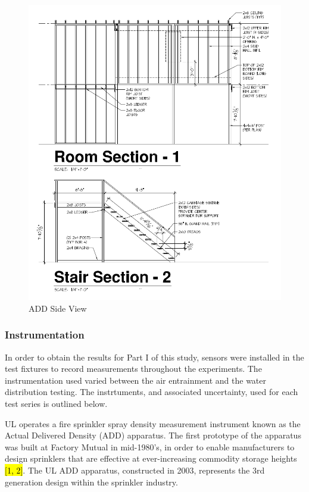 \documentclass{article}
\begin{document}
\begin{figure}[!ht]
	\centering
	\includegraphics[width=5.5in]{Figures/Water_Distribution/ADDsideviewprint.png}
	\caption{ADD Side View}
	\label{fig:ADD_Side_View}
\end{figure}

\clearpage

\subsubsection{Instrumentation}

In order to obtain the results for Part I of this study, sensors were installed in the test fixtures to record measurements throughout the experiments. The instrumentation used varied between the air entrainment and the water distribution testing. The instrtuments, and associated uncertainty, used for each test series is outlined below.

UL operates a fire sprinkler spray density measurement instrument known as the Actual Delivered Density (ADD) apparatus. The first prototype of the apparatus was built at Factory Mutual in mid-1980’s, in order to enable manufacturers to design sprinklers that are effective at ever-increasing commodity storage heights \hl{[1, 2]}. The UL ADD apparatus, constructed in 2003, represents the 3rd generation design within the sprinkler industry. 
 
\end{document}

